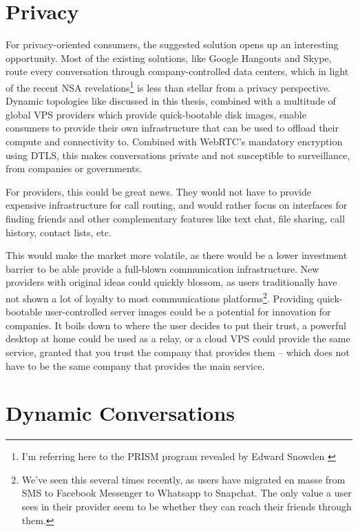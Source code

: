 \section{Privacy}

For privacy-oriented consumers, the suggested solution opens up an interesting opportunity. Most of the existing solutions, like Google Hangouts and Skype, route every conversation through company-controlled data centers, which in light of the recent NSA revelations\footnote{I'm referring here to the PRISM program revealed by Edward Snowden \cite{prism}} is less than stellar from a privacy perspective. Dynamic topologies like discussed in this thesis, combined with a multitude of global VPS providers which provide quick-bootable disk images, enable consumers to provide their own infrastructure that can be used to offload their compute and connectivity to. Combined with WebRTC's mandatory encryption using DTLS, this makes conversations private and not susceptible to surveillance, from companies or governments.

For providers, this could be great news. They would not have to provide expensive infrastructure for call routing, and would rather focus on interfaces for finding friends and other complementary features like text chat, file sharing, call history, contact lists, etc.

This would make the market more volatile, as there would be a lower investment barrier to be able provide a full-blown communication infrastructure. New providers with original ideas could quickly blossom, as users traditionally have not shown a lot of loyalty to most communications platforms\footnote{We've seen this several times recently, as users have migrated en masse from SMS to Facebook Messenger to Whatsapp to Snapchat. The only value a user sees in their provider seem to be whether they can reach their friends through them.}. Providing quick-bootable user-controlled server images could be a potential for innovation for companies. It boils down to where the user decides to put their trust, a powerful desktop at home could be used as a relay, or a cloud VPS could provide the same service, granted that you trust the company that provides them -- which does not have to be the same company that provides the main service.


\section{Dynamic Conversations}\label{sec:dynamic-conversations}


